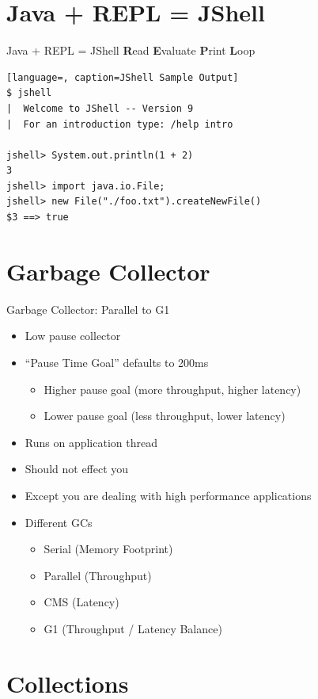 \section{Java + REPL = JShell}

\begin{frame}[fragile]{Java + REPL = JShell}
\textbf{R}ead \textbf{E}valuate \textbf{P}rint \textbf{L}oop
\begin{lstlisting}[language=, caption=JShell Sample Output]
$ jshell
|  Welcome to JShell -- Version 9
|  For an introduction type: /help intro

jshell> System.out.println(1 + 2)
3
jshell> import java.io.File;
jshell> new File("./foo.txt").createNewFile()
$3 ==> true
\end{lstlisting}
\end{frame}

\section{Garbage Collector}

\begin{frame}{Garbage Collector: Parallel to G1}
	\begin{itemize}
		\item Low pause collector
		\item \enquote{Pause Time Goal} defaults to 200ms
		\begin{itemize}
			\item Higher pause goal (more throughput, higher latency)
			\item Lower pause goal (less throughput, lower latency)
		\end{itemize}
		\item Runs on application thread
		\item Should not effect you
		\item Except you are dealing with high performance applications
		\item Different GCs
		\begin{itemize}
			\item Serial (Memory Footprint)
			\item Parallel (Throughput)
			\item CMS (Latency)
			\item G1 (Throughput / Latency Balance)
		\end{itemize}
	\end{itemize}
\end{frame}

\section{Collections}

